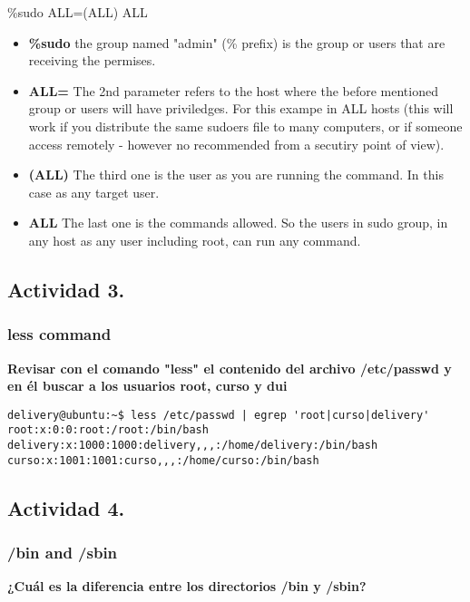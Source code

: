\documentclass[a4paper,11pt,spanish]{article} %
\newenvironment{myscriptlisting}
{\begin{list}{}{\setlength{\leftmargin}{1em}}\item\scriptsize\bfseries}
{\end{list}}
\begin{document}
\%sudo ALL=(ALL) ALL
\begin{itemize}
 \item \textbf{\%sudo} the group named "admin" (\% prefix) is the group or users that
 are receiving the permises.
 \item \textbf{ALL=} The 2nd parameter refers to the host where the before mentioned group or
 users will have priviledges. For this exampe in ALL hosts (this will work if you distribute
 the same sudoers file to many computers, or if someone access remotely - however no recommended
 from a secutiry point of view).
 \item \textbf{(ALL)} The third one is the user as you are running the command. In this case
 as any target user.
 \item \textbf{ALL} The last one is the commands allowed. So the users in sudo group, in any host
 as any user including root, can run any command.
\end{itemize}

\subsection{Actividad 3.}

\subsubsection{less command}
\textbf{Revisar con el comando "less" el contenido del archivo /etc/passwd y en él buscar a los usuarios 
root, curso y dui}

\begin{myscriptlisting}
  \begin{verbatim}
delivery@ubuntu:~$ less /etc/passwd | egrep 'root|curso|delivery'
root:x:0:0:root:/root:/bin/bash
delivery:x:1000:1000:delivery,,,:/home/delivery:/bin/bash
curso:x:1001:1001:curso,,,:/home/curso:/bin/bash
  \end{verbatim}
\end{myscriptlisting}

\subsection{Actividad 4.}

\subsubsection{/bin and /sbin}
\textbf{¿Cuál es la diferencia entre los directorios /bin y /sbin?}
\end{document}
